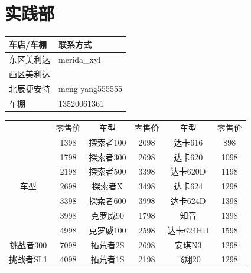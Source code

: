 \documentclass{ctexbook}
\begin{document}
\section{实践部}
\begin{table}[htbp]
    \centering
    \begin{tabular}{|l|l|}
    \hline
        车店/车棚 & 联系方式     \\ \hline
        东区美利达 & merida\_xyl      \\ \hline
        西区美利达 &     \\ \hline
        北辰捷安特 & meng-yang555555    \\ \hline
        车棚 & 13520061361     \\ \hline
    \end{tabular}
\end{table}
\begin{table}[H]
    \centering
    \begin{tabular}{|c|c|c|c|c|c|}
    \hline
                                   & 零售价        & 车型           & 零售价        & 车型           & 零售价       \\ \cline{2-6} 
                                   & 1398       & 探索者100       & 2098       & 达卡616        & 898       \\ \cline{2-6} 
                                   & 1798       & 探索者300       & 2698       & 达卡620        & 1098      \\ \cline{2-6} 
                                   & 2198       & 探索者500       & 3398       & 达卡620D       & 1198      \\ \cline{2-6} 
    \multirow{-5}{*}{车型}           & 2698       & 探索者X         & 3498       & 达卡624        & 1298      \\ \hline
                                   & 3398       & 探索者600       & 3998       & 达卡624D       & 1398      \\ \cline{2-6} 
                                   & 3998       & 克罗威90        & 1798       & 知音           & 1398      \\ \cline{2-6} 
                                   & 4998       & 克罗威100       & 2598       & 达卡624HD      & 1598      \\ \cline{2-6} 
    \multirow{-4}{*}{挑战者300}       & 7098       & 拓荒者2S        & 2698       & 安琪N3         & 1298      \\ \hline
    挑战者SL1                         & 4098       & 拓荒者1S        & 2198       & 飞翔20         & 1298      \\ \hline

\end{tabular}
\end{table}
\end{document}
